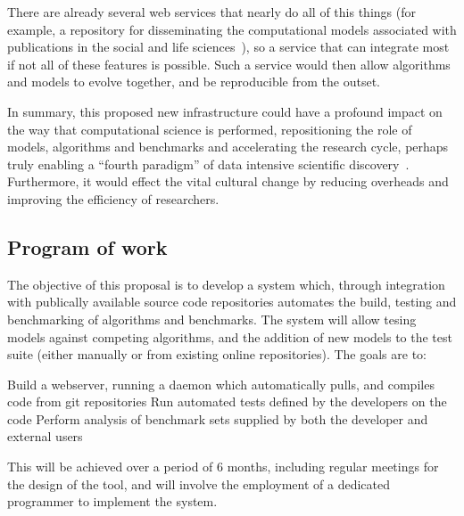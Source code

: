 \documentclass[a4paper,11pt]{article}
\begin{document}
There are already several web services that nearly do all of this
things (for example, a repository for disseminating the computational
models associated with publications in the social and life
sciences~\cite{rollins-et-al:2014}), so a service that can integrate
most if not all of these features is possible. Such a service would
then allow algorithms and models to evolve together, and be
reproducible from the outset.

In summary, this proposed new infrastructure could have a profound
impact on the way that computational science is performed,
repositioning the role of models, algorithms and benchmarks and
accelerating the research cycle, perhaps truly enabling a ``fourth
paradigm'' of data intensive scientific
discovery~\cite{hey:2009}. Furthermore, it would effect the vital
cultural change by reducing overheads and improving the efficiency of
researchers.

\subsection*{Program of work}

The objective of this proposal is to develop a system which, through
integration with publically available source code repositories automates
the build, testing and benchmarking of algorithms and benchmarks. The 
system will allow tesing models against competing algorithms, and the
addition of new models to the test suite (either manually or from existing
online repositories). The goals are to:


Build a webserver, running a daemon which automatically pulls, and compiles
code from git repositories
Run automated tests defined by the developers on the code
Perform analysis of benchmark sets supplied by both the developer and external
users

This will be achieved over a period of 6 months, including regular meetings
for the design of the tool, and will involve the employment of a dedicated 
programmer to implement the system.

\end{document}
